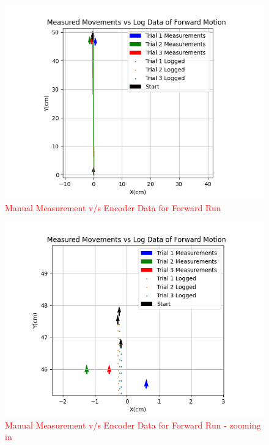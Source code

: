 {        \begin{figure}[!ht] 
            \centering \includegraphics[scale=.60]{"images/experiment_2/Figure_forward.png"}
            \caption{\textcolor{red}{Manual Measurement v/s Encoder Data for Forward Run}}
            \label{fig:forward-manual-encoder}
        \end{figure}
        
         \begin{figure}[!ht] 
            \centering \includegraphics[scale=.60]{"images/experiment_2/Figure_forward_zoom.png"}
            \caption{\textcolor{red}{Manual Measurement v/s Encoder Data for Forward Run - zooming in}}
            \label{fig:forward-manual-encoder-zoom}
        \end{figure}
        
}
